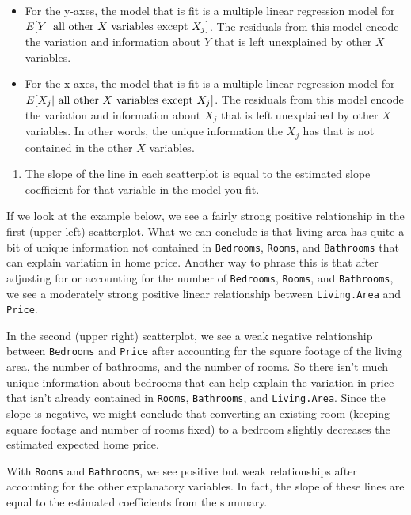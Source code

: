 \documentclass[
]{book}
\providecommand{\tightlist}{%
  \setlength{\itemsep}{0pt}\setlength{\parskip}{0pt}}
\begin{document}
\begin{itemize}
\tightlist
\item
  For the y-axes, the model that is fit is a multiple linear regression model for \(E[Y |\hbox{ all other }X\hbox{ variables except }X_j]\). The residuals from this model encode the variation and information about \(Y\) that is left unexplained by other \(X\) variables.
\item
  For the x-axes, the model that is fit is a multiple linear regression model for \(E[X_j | \hbox{ all other }X\hbox{ variables except }X_j]\). The residuals from this model encode the variation and information about \(X_j\) that is left unexplained by other \(X\) variables. In other words, the unique information the \(X_j\) has that is not contained in the other \(X\) variables.
\end{itemize}

\begin{enumerate}
\def\labelenumi{\arabic{enumi}.}
\setcounter{enumi}{2}
\tightlist
\item
  The slope of the line in each scatterplot is equal to the estimated slope coefficient for that variable in the model you fit.
\end{enumerate}

If we look at the example below, we see a fairly strong positive relationship in the first (upper left) scatterplot. What we can conclude is that living area has quite a bit of unique information not contained in \texttt{Bedrooms}, \texttt{Rooms}, and \texttt{Bathrooms} that can explain variation in home price. Another way to phrase this is that after adjusting for or accounting for the number of \texttt{Bedrooms}, \texttt{Rooms}, and \texttt{Bathrooms}, we see a moderately strong positive linear relationship between \texttt{Living.Area} and \texttt{Price}.

In the second (upper right) scatterplot, we see a weak negative relationship between \texttt{Bedrooms} and \texttt{Price} after accounting for the square footage of the living area, the number of bathrooms, and the number of rooms. So there isn't much unique information about bedrooms that can help explain the variation in price that isn't already contained in \texttt{Rooms}, \texttt{Bathrooms}, and \texttt{Living.Area}. Since the slope is negative, we might conclude that converting an existing room (keeping square footage and number of rooms fixed) to a bedroom slightly decreases the estimated expected home price.

With \texttt{Rooms} and \texttt{Bathrooms}, we see positive but weak relationships after accounting for the other explanatory variables. In fact, the slope of these lines are equal to the estimated coefficients from the summary.
\end{document}

